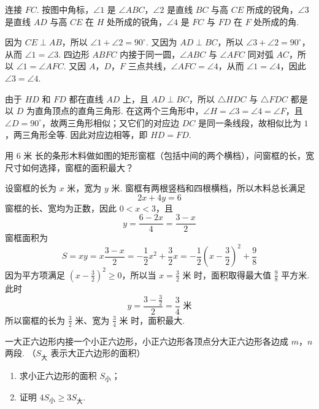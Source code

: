 \begin{solution}
连接 \(FC\). 按图中角标，\(\angle1\) 是 \(\angle ABC\)，\(\angle2\) 是直线 \(BC\) 与高 \(CE\) 所成的锐角，\(\angle3\) 是直线 \(AD\) 与高 \(CE\) 在 \(H\) 处所成的锐角，\(\angle4\) 是 \(FC\) 与 \(FD\) 在 \(F\) 处所成的角.

因为 \(CE\perp AB\)，所以 \(\angle1+\angle2=90^{\circ}\). 又因为 \(AD\perp BC\)，所以 \(\angle3+\angle2=90^{\circ}\)，从而 \(\angle1=\angle3\). 四边形 \(ABFC\) 内接于同一圆，\(\angle ABC\) 与 \(\angle AFC\) 同对弧 \(AC\)，所以 \(\angle1=\angle AFC\). 又因 \(A\)，\(D\)，\(F\) 三点共线，\(\angle AFC=\angle4\)，从而 \(\angle1=\angle4\)，因此 \(\angle3=\angle4\).

由于 \(HD\) 和 \(FD\) 都在直线 \(AD\) 上，且 \(AD\perp BC\)，所以 \(\triangle HDC\) 与 \(\triangle FDC\) 都是以 \(D\) 为直角顶点的直角三角形. 在这两个三角形中，\(\angle H=\angle3=\angle4=\angle F\)，且 \(\angle D=90^{\circ}\)，故两三角形相似；又它们的对应边 \(DC\) 是同一条线段，故相似比为 \(1\)，两三角形全等. 因此对应边相等，即 \(HD=FD\).
\end{solution}

\begin{problem}
用 \(6\text{ 米}\) 长的条形木料做如图的矩形窗框（包括中间的两个横档），问窗框的长，宽尺寸如何选择，窗框的面积最大？

\end{problem}

\begin{solution}
设窗框的长为 \(x\text{ 米}\)，宽为 \(y\text{ 米}\). 窗框有两根竖档和四根横档，所以木料总长满足
\[
2x+4y=6
\]
窗框的长、宽均为正数，因此 \(0<x<3\)，且
\[
y=\frac{6-2x}{4}=\frac{3-x}{2}
\]
窗框面积为
\[
S=xy=x\frac{3-x}{2}
 =-\frac{1}{2}x^{2}+\frac{3}{2}x
 =-\frac{1}{2}\left(x-\frac{3}{2}\right)^{2}+\frac{9}{8}
\]
因为平方项满足 \(\left(x-\frac{3}{2}\right)^{2}\geqslant0\)，所以当 \(x=\frac{3}{2}\text{ 米}\) 时，面积取得最大值 \(\frac{9}{8}\text{ 平方米}\). 此时
\[
y=\frac{3-\frac{3}{2}}{2}=\frac{3}{4}\text{ 米}
\]
所以窗框的长为 \(\frac{3}{2}\text{ 米}\)、宽为 \(\frac{3}{4}\text{ 米}\) 时，面积最大.
\end{solution}

\begin{problem}
一大正六边形内接一个小正六边形，小正六边形各顶点分大正六边形各边成 \(m\)，\(n\) 两段. （\(S_{\text{大}}\) 表示大正六边形的面积）
\begin{enumerate}
\item 求小正六边形的面积 \(S_{\text{小}}\)；
\item 证明 \(4S_{\text{小}}\geqslant 3S_{\text{大}}\).
\end{enumerate}

\end{problem}

